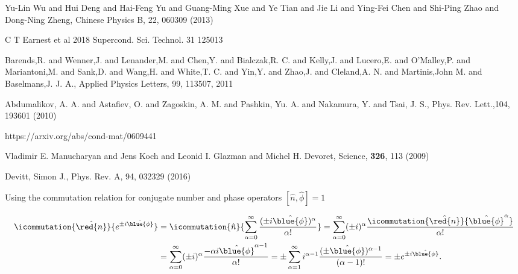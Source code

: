 \begin{thebibliography}{99}


 {Yu-Lin Wu and Hui Deng and Hai-Feng Yu and
    Guang-Ming Xue and Ye Tian and Jie Li and Ying-Fei Chen and
    Shi-Ping Zhao and Dong-Ning Zheng}, {Chinese Physics B}, {22},
  {060309} (2013)

 C T Earnest et al 2018
  Supercond. Sci. Technol. 31 125013
  
 {Barends,R. and Wenner,J. and Lenander,M. and
    Chen,Y. and Bialczak,R. C. and Kelly,J. and Lucero,E. and
    O'Malley,P. and Mariantoni,M. and Sank,D. and Wang,H. and
    White,T. C. and Yin,Y. and Zhao,J. and Cleland,A. N. and
    Martinis,John M. and Baselmans,J. J. A.}, {Applied Physics
    Letters}, 99, {113507}, {2011}

 {Abdumalikov, A. A. and Astafiev, O. and
    Zagoskin, A. M. and Pashkin, Yu. A. and Nakamura, Y. and Tsai,
    J. S.}, {Phys. Rev. Lett.},104, {193601} (2010)

 https://arxiv.org/abs/cond-mat/0609441

 {Vladimir E. Manucharyan and Jens Koch and
    Leonid I. Glazman and Michel H. Devoret}, {Science}, \textbf{326},
  113 (2009)

 Devitt, Simon J., Phys. Rev. A, {94}, {032329}
  (2016)

 Using the commutation relation for conjugate number
  and phase operators $ \left[\hat{n},\hat{\phi}\right] = 1 $
 
  {\scriptsize\begin{equation}\label{eq:ab1}
      \begin{aligned}
        \icommutation{\hat{\red{n}}}{e^{\pm i \hat{\blue{\phi}}}} & =  \icommutation{\hat{n}}{\sum_{\alpha = 0}^{\infty} \frac{(\pm i\hat{\blue{\phi}})^\alpha}{\alpha!}} = \sum_{\alpha = 0}^{\infty} (\pm i)^\alpha\frac{\icommutation{\hat{\red{n}}}{\hat{\blue{\phi}}^\alpha}}{\alpha!}\\
        & = \sum_{\alpha = 0}^{\infty} (\pm i)^\alpha\frac{-\alpha i\hat{\blue{\phi}}^{\alpha -
            1}}{\alpha!} = \pm \sum_{\alpha = 1}^{\infty}i^{\alpha -
          1}\frac{(\pm\hat{\blue{\phi}})^{\alpha - 1}}{(\alpha - 1)!} = \pm e^{\pm
          i\hat{\blue{\phi}}}.
      \end{aligned}
    \end{equation}}
 
  \vspace{-1em}


\end{thebibliography}
